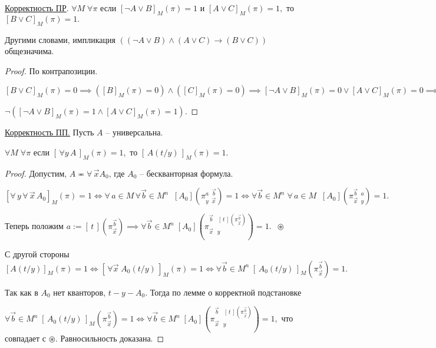 \documentclass[a4paper, fleqn]{article}
\begin{document}
    \underline{Корректность ПР}. $\forall M \; \forall \pi$ если $[\neg A \lor B]_M (\pi) = 1$  и $[ A \lor C]_M (\pi) = 1,$ то $[B \lor C]_M (\pi) = 1.$

    Другими словами, импликация $( (\neg A \lor B) \land (A \lor C) \to (B \lor C) )$ общезначима.

    \begin{proof} По контрапозиции.

    $[B \lor C]_M (\pi) = 0 \implies \left([B]_M (\pi) = 0\right) \land \left([C]_M (\pi) = 0\right) \implies [\neg A \lor B]_M (\pi) = 0 \lor   [ A \lor C]_M (\pi) = 0 \implies$

    $ \neg([\neg A \lor B]_M (\pi) = 1 \land   [ A \lor C]_M (\pi) = 1).$
    \end{proof}


    \underline{Корректность ПП.} Пусть $A$ -- универсальна.

    $\forall M \; \forall \pi$ если $[ \, \forall y \,  A \, ]_M (\pi) = 1,$  то $[ \, A(t/y) \, ]_M (\pi) = 1.$

    \begin{proof}
    Допустим, $A \eqcirc \forall \, \overrightarrow{x} A_0$, где $A_0$ -- бескванторная формула.

    $[\forall \, y \, \forall \, \overrightarrow{x} \, A_0 ]_M (\pi) = 1 \iff \forall \, a \in M \, \forall  \overrightarrow{b} \in M^n \;  \; [A_0] \left(\pi^{a \; \; \overrightarrow{b}}_{y \; \; \overrightarrow{x}} \right) = 1 \iff \forall  \overrightarrow{b} \in M^n \;   \forall \, a \in M  \;  \; [A_0] \left(\pi^{\overrightarrow{b} \; \; a}_{\overrightarrow{x} \; \; y} \right) = 1.$

    Теперь положим $a := [ \, t \,]  \left(\pi_{\overrightarrow{x}}^{\overrightarrow{b}} \right) \implies \forall \overrightarrow{b} \in M^n \; [A_0] \left( \pi_{\overrightarrow{x} \; \; \, y}^{\overrightarrow{b} \; \; \; [ \, t \,]  \left(\pi_{\overrightarrow{x}}^{\overrightarrow{b}} \right)} \right) = 1. \; \; \circledast$

    С другой стороны $[A(t/y)]_M(\pi) = 1 \iff [ \, \forall \overrightarrow{x} \; A_0 (t/y) \,  ]_M (\pi) = 1 \iff \forall \overrightarrow{b} \in M^n \; [ \, A_0(t/y) \, ]_M \left(\pi_{\overrightarrow{x}}^{\overrightarrow{b}} \right) = 1.$

    Так как в $A_0$  нет кванторов, $t-y-A_0.$ Тогда по лемме о корректной подстановке

    $\forall \overrightarrow{b} \in M^n \; [ \, A_0(t/y) \, ]_M \left(\pi_{\overrightarrow{x}}^{\overrightarrow{b}} \right) = 1 \iff \forall \overrightarrow{b} \in M^n \; [A_0] \left( \pi_{\overrightarrow{x} \; \; \, y}^{\overrightarrow{b} \; \; \; [ \, t \,]  \left(\pi_{\overrightarrow{x}}^{\overrightarrow{b}} \right)} \right) = 1,$ что совпадает с  $\circledast.$ Равносильность доказана.

    \end{proof}
\end{document}
